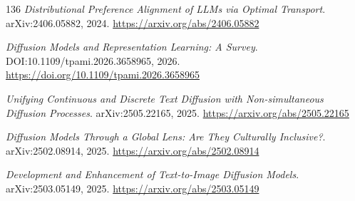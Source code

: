 \documentclass[11pt,a4paper]{article}
\begin{document}
\begin{thebibliography}{136}
\newblock \emph{Distributional Preference Alignment of LLMs via Optimal Transport}.
\newblock arXiv:2406.05882, 2024.
\newblock \url{https://arxiv.org/abs/2406.05882}

\newblock \emph{Diffusion Models and Representation Learning: A Survey}.
\newblock DOI:10.1109/tpami.2026.3658965, 2026.
\newblock \url{https://doi.org/10.1109/tpami.2026.3658965}

\newblock \emph{Unifying Continuous and Discrete Text Diffusion with Non-simultaneous Diffusion Processes}.
\newblock arXiv:2505.22165, 2025.
\newblock \url{https://arxiv.org/abs/2505.22165}

\newblock \emph{Diffusion Models Through a Global Lens: Are They Culturally Inclusive?}.
\newblock arXiv:2502.08914, 2025.
\newblock \url{https://arxiv.org/abs/2502.08914}

\newblock \emph{Development and Enhancement of Text-to-Image Diffusion Models}.
\newblock arXiv:2503.05149, 2025.
\newblock \url{https://arxiv.org/abs/2503.05149}

\end{thebibliography}
\end{document}
